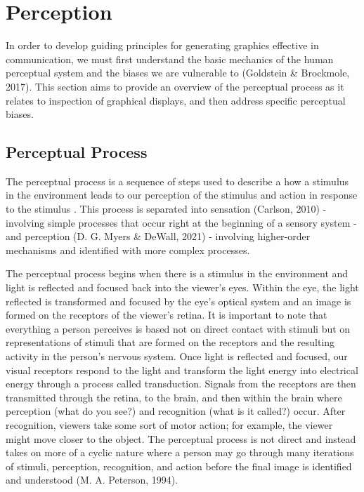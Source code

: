 \documentclass[print]{nuthesis}
\begin{document}
\hypertarget{perception}{%
\section{Perception}\label{perception}}

In order to develop guiding principles for generating graphics effective in communication, we must first understand the basic mechanics of the human perceptual system and the biases we are vulnerable to (Goldstein \& Brockmole, 2017). This section aims to provide an overview of the perceptual process as it relates to inspection of graphical displays, and then address specific perceptual biases.

\hypertarget{perceptual-process}{%
\subsection{Perceptual Process}\label{perceptual-process}}

The perceptual process is a sequence of steps used to describe a how a stimulus in the environment leads to our perception of the stimulus and action in response to the stimulus .
This process is separated into sensation (Carlson, 2010) - involving simple processes that occur right at the beginning of a sensory system - and perception (D. G. Myers \& DeWall, 2021) - involving higher-order mechanisms and identified with more complex processes.

The perceptual process begins when there is a stimulus in the environment and light is reflected and focused back into the viewer's eyes.
Within the eye, the light reflected is transformed and focused by the eye's optical system and an image is formed on the receptors of the viewer's retina.
It is important to note that everything a person perceives is based not on direct contact with stimuli but on representations of stimuli that are formed on the receptors and the resulting activity in the person's nervous system.
Once light is reflected and focused, our visual receptors respond to the light and transform the light energy into electrical energy through a process called transduction.
Signals from the receptors are then transmitted through the retina, to the brain, and then within the brain where perception (what do you see?) and recognition (what is it called?) occur.
After recognition, viewers take some sort of motor action; for example, the viewer might move closer to the object.
The perceptual process is not direct and instead takes on more of a cyclic nature where a person may go through many iterations of stimuli, perception, recognition, and action before the final image is identified and understood (M. A. Peterson, 1994).
\end{document}
